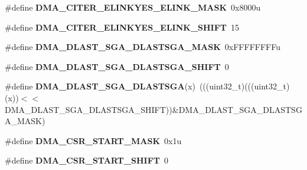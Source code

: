 \begin{DoxyCompactItemize}
\item 
\#define {\bfseries D\+M\+A\+\_\+\+C\+I\+T\+E\+R\+\_\+\+E\+L\+I\+N\+K\+Y\+E\+S\+\_\+\+E\+L\+I\+N\+K\+\_\+\+M\+A\+SK}~0x8000u\hypertarget{group__DMA__Register__Masks_ga1f0a2f5fd8eaf8a52fcea91e57e48c11}{}\label{group__DMA__Register__Masks_ga1f0a2f5fd8eaf8a52fcea91e57e48c11}

\item 
\#define {\bfseries D\+M\+A\+\_\+\+C\+I\+T\+E\+R\+\_\+\+E\+L\+I\+N\+K\+Y\+E\+S\+\_\+\+E\+L\+I\+N\+K\+\_\+\+S\+H\+I\+FT}~15\hypertarget{group__DMA__Register__Masks_ga8934a876cf4971db85286742f46b1ddb}{}\label{group__DMA__Register__Masks_ga8934a876cf4971db85286742f46b1ddb}

\item 
\#define {\bfseries D\+M\+A\+\_\+\+D\+L\+A\+S\+T\+\_\+\+S\+G\+A\+\_\+\+D\+L\+A\+S\+T\+S\+G\+A\+\_\+\+M\+A\+SK}~0x\+F\+F\+F\+F\+F\+F\+F\+Fu\hypertarget{group__DMA__Register__Masks_gaf1fd5a37254e4699b6c8a52601ae30d9}{}\label{group__DMA__Register__Masks_gaf1fd5a37254e4699b6c8a52601ae30d9}

\item 
\#define {\bfseries D\+M\+A\+\_\+\+D\+L\+A\+S\+T\+\_\+\+S\+G\+A\+\_\+\+D\+L\+A\+S\+T\+S\+G\+A\+\_\+\+S\+H\+I\+FT}~0\hypertarget{group__DMA__Register__Masks_gac7f56cf638102a09cb466aaa5b477a3d}{}\label{group__DMA__Register__Masks_gac7f56cf638102a09cb466aaa5b477a3d}

\item 
\#define {\bfseries D\+M\+A\+\_\+\+D\+L\+A\+S\+T\+\_\+\+S\+G\+A\+\_\+\+D\+L\+A\+S\+T\+S\+GA}(x)~(((uint32\+\_\+t)(((uint32\+\_\+t)(x))$<$$<$D\+M\+A\+\_\+\+D\+L\+A\+S\+T\+\_\+\+S\+G\+A\+\_\+\+D\+L\+A\+S\+T\+S\+G\+A\+\_\+\+S\+H\+I\+FT))\&D\+M\+A\+\_\+\+D\+L\+A\+S\+T\+\_\+\+S\+G\+A\+\_\+\+D\+L\+A\+S\+T\+S\+G\+A\+\_\+\+M\+A\+SK)\hypertarget{group__DMA__Register__Masks_ga358ed52ff86816c240491d35576a8183}{}\label{group__DMA__Register__Masks_ga358ed52ff86816c240491d35576a8183}

\item 
\#define {\bfseries D\+M\+A\+\_\+\+C\+S\+R\+\_\+\+S\+T\+A\+R\+T\+\_\+\+M\+A\+SK}~0x1u\hypertarget{group__DMA__Register__Masks_gac9356cdce4f3a2f7986ce84cbb0cd31f}{}\label{group__DMA__Register__Masks_gac9356cdce4f3a2f7986ce84cbb0cd31f}

\item 
\#define {\bfseries D\+M\+A\+\_\+\+C\+S\+R\+\_\+\+S\+T\+A\+R\+T\+\_\+\+S\+H\+I\+FT}~0\hypertarget{group__DMA__Register__Masks_ga195c81979f073c246c7cfd65eb5beeba}{}\label{group__DMA__Register__Masks_ga195c81979f073c246c7cfd65eb5beeba}


\end{DoxyCompactItemize}
